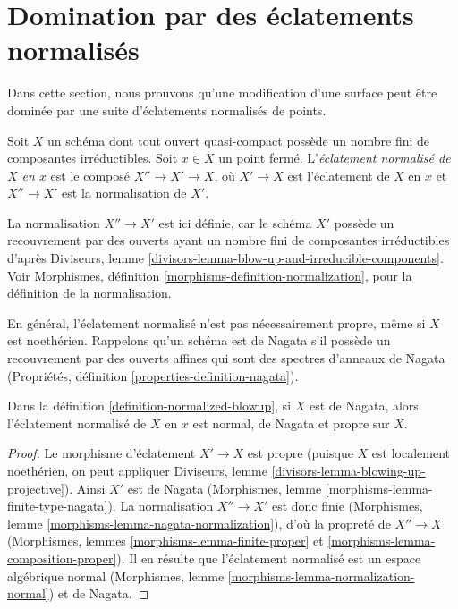 \section{Domination par des éclatements normalisés} \label{section-normalized-blowups}

\noindent Dans cette section, nous prouvons qu'une modification d'une surface peut être dominée par une suite d'éclatements normalisés de points.

\begin{definition} \label{definition-normalized-blowup} Soit $X$ un schéma dont tout ouvert quasi-compact possède un nombre fini de composantes irréductibles. Soit $x \in X$ un point fermé. L'{\it éclatement normalisé de $X$ en $x$} est le composé $X'' \to X' \to X$, où $X' \to X$ est l'éclatement de $X$ en $x$ et $X'' \to X'$ est la normalisation de $X'$. \end{definition}

\noindent La normalisation $X'' \to X'$ est ici définie, car le schéma $X'$ possède un recouvrement par des ouverts ayant un nombre fini de composantes irréductibles d'après Diviseurs, lemme \ref{divisors-lemma-blow-up-and-irreducible-components}. Voir Morphismes, définition \ref{morphisms-definition-normalization}, pour la définition de la normalisation.

\medskip\noindent En général, l'éclatement normalisé n'est pas nécessairement propre, même si $X$ est noethérien. Rappelons qu'un schéma est de Nagata s'il possède un recouvrement par des ouverts affines qui sont des spectres d'anneaux de Nagata (Propriétés, définition \ref{properties-definition-nagata}).

\begin{lemma} \label{lemma-Nagata-normalized-blowup} Dans la définition \ref{definition-normalized-blowup}, si $X$ est de Nagata, alors l'éclatement normalisé de $X$ en $x$ est normal, de Nagata et propre sur $X$. \end{lemma}

\begin{proof} Le morphisme d'éclatement $X' \to X$ est propre (puisque $X$ est localement noethérien, on peut appliquer Diviseurs, lemme \ref{divisors-lemma-blowing-up-projective}). Ainsi $X'$ est de Nagata (Morphismes, lemme \ref{morphisms-lemma-finite-type-nagata}). La normalisation $X'' \to X'$ est donc finie (Morphismes, lemme \ref{morphisms-lemma-nagata-normalization}), d'où la propreté de $X'' \to X$ (Morphismes, lemmes \ref{morphisms-lemma-finite-proper} et \ref{morphisms-lemma-composition-proper}). Il en résulte que l'éclatement normalisé est un espace algébrique normal (Morphismes, lemme \ref{morphisms-lemma-normalization-normal}) et de Nagata. \end{proof}

